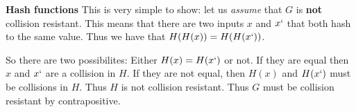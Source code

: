 \documentclass[12pt]{article}
\begin{document}
\begin{list}{.}{}
\begin{list}{)}{}
\end{list}

\item \textbf{Hash functions}
This is very simple to show: let us \emph{assume} that $G$ is \textbf{not}
collision resistant.  This means that there are two inputs $x$ and $x`$ that
both hash to the same value.  Thus we have that $H(H(x)) = H(H(x`))$.

So there are two possibilites: Either $H(x) = H(x`)$ or not.  If they are equal
then $x$ and $x`$ are a collision in $H$.  If they are not equal, then $H(x)$
and $H(x`)$ must be collisions in $H$.  Thus $H$ is not collision resistant.
Thus $G$ must be collision resistant by contrapositive.
\end{list}
\end{document}
